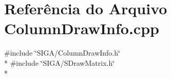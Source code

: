 \section{Referência do Arquivo Column\+Draw\+Info.\+cpp}
\label{_column_draw_info_8cpp}
{\ttfamily \#include \char`\"{}S\+I\+G\+A/\+Column\+Draw\+Info.\+h\char`\"{}}\\*
{\ttfamily \#include \char`\"{}S\+I\+G\+A/\+S\+Draw\+Matrix.\+h\char`\"{}}\\*
